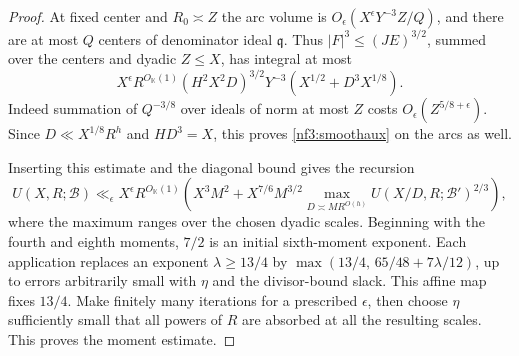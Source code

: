 \documentclass[11pt,letterpaper]{article}
\theoremstyle{definition}
\numberwithin{equation}{section}
\begin{document}
\begin{proof}
At fixed center and $R_0\asymp Z$ the arc volume is
$O_\epsilon(X^\epsilon Y^{-3}Z/Q)$, and there are at most $Q$
centers of denominator ideal $\mathfrak q$. Thus
$|F|^3\le(JE)^{3/2}$, summed over the centers and dyadic
$Z\le X$, has integral at most
\[
 X^\epsilon R^{O_{\mathbb K}(1)}
 (H^2X^2D)^{3/2}Y^{-3}
                  (X^{1/2}+D^3X^{1/8}).
\]
Indeed summation of $Q^{-3/8}$ over ideals of norm at most $Z$
costs $O_\epsilon(Z^{5/8+\epsilon})$.
Since $D\ll X^{1/8}R^h$ and $HD^3=X$, this proves
\eqref{nf3:smoothaux} on the arcs as well.

Inserting this estimate and the diagonal bound gives the recursion
\[
 U(X,R;\mathcal B)\ll_\epsilon X^\epsilon R^{O_{\mathbb K}(1)}
 \left(X^3 M^2+
       X^{7/6}M^{3/2}\max_{D\asymp M R^{O(h)}}
             U(X/D,R;\mathcal B')^{2/3}\right),
\]
where the maximum ranges over the chosen dyadic scales.
Beginning with the fourth and eighth moments, $7/2$ is an
initial sixth-moment exponent. Each application replaces an
exponent $\lambda\ge13/4$ by
$\max(13/4,\,65/48+7\lambda/12)$, up to errors arbitrarily
small with $\eta$ and the divisor-bound slack. This affine map
fixes $13/4$. Make finitely many iterations for a prescribed
$\epsilon$, then choose $\eta$ sufficiently small that all
powers of $R$ are absorbed at all the resulting scales.
This proves the moment estimate.


\end{proof}
\end{document}
